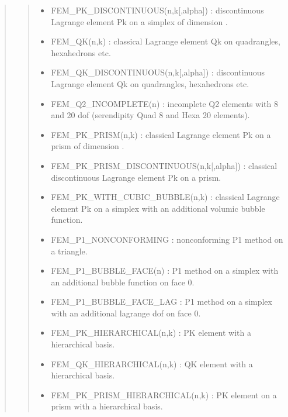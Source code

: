 \documentclass[a4paper,11pt,english]{sphinxmanual}
\begin{document}
\begin{quote}
\begin{quote}
\begin{itemize}
\item {} 
\sphinxAtStartPar
FEM\_PK\_DISCONTINUOUS(n,k{[},alpha{]}) :
discontinuous Lagrange element Pk on a simplex of dimension .

\item {} 
\sphinxAtStartPar
FEM\_QK(n,k) :
classical Lagrange element Qk on quadrangles, hexahedrons etc.

\item {} 
\sphinxAtStartPar
FEM\_QK\_DISCONTINUOUS(n,k{[},alpha{]}) :
discontinuous Lagrange element Qk on quadrangles, hexahedrons etc.

\item {} 
\sphinxAtStartPar
FEM\_Q2\_INCOMPLETE(n) :
incomplete Q2 elements with 8 and 20 dof (serendipity Quad 8 and
Hexa 20 elements).

\item {} 
\sphinxAtStartPar
FEM\_PK\_PRISM(n,k) :
classical Lagrange element Pk on a prism of dimension .

\item {} 
\sphinxAtStartPar
FEM\_PK\_PRISM\_DISCONTINUOUS(n,k{[},alpha{]}) :
classical discontinuous Lagrange element Pk on a prism.

\item {} 
\sphinxAtStartPar
FEM\_PK\_WITH\_CUBIC\_BUBBLE(n,k) :
classical Lagrange element Pk on a simplex with an additional
volumic bubble function.

\item {} 
\sphinxAtStartPar
FEM\_P1\_NONCONFORMING :
non\sphinxhyphen{}conforming P1 method on a triangle.

\item {} 
\sphinxAtStartPar
FEM\_P1\_BUBBLE\_FACE(n) :
P1 method on a simplex with an additional bubble function on face 0.

\item {} 
\sphinxAtStartPar
FEM\_P1\_BUBBLE\_FACE\_LAG :
P1 method on a simplex with an additional lagrange dof on face 0.

\item {} 
\sphinxAtStartPar
FEM\_PK\_HIERARCHICAL(n,k) :
PK element with a hierarchical basis.

\item {} 
\sphinxAtStartPar
FEM\_QK\_HIERARCHICAL(n,k) :
QK element with a hierarchical basis.

\item {} 
\sphinxAtStartPar
FEM\_PK\_PRISM\_HIERARCHICAL(n,k) :
PK element on a prism with a hierarchical basis.


\end{itemize}
\end{quote}
\end{quote}
\end{document}
